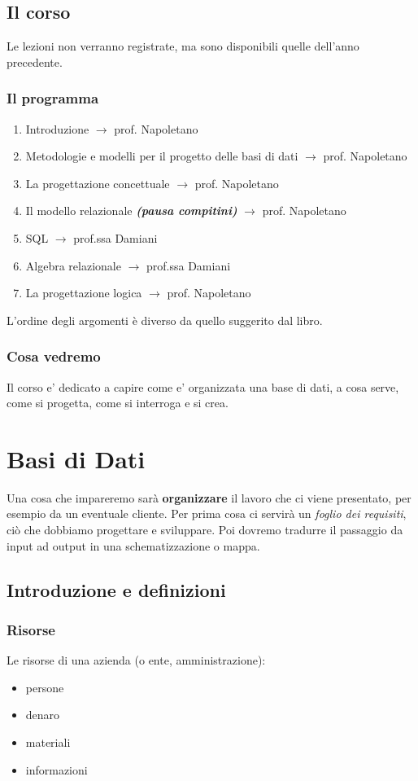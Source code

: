 \section{Il corso}
Le lezioni non verranno registrate, ma sono disponibili quelle dell'anno precedente.

\subsection{Il programma}
\begin{enumerate}
    \item Introduzione $\rightarrow$ prof. Napoletano
    \item Metodologie e modelli per il progetto delle basi di dati $\rightarrow$ prof. Napoletano
    \item La progettazione concettuale $\rightarrow$ prof. Napoletano
    \item Il modello relazionale \textbf{\textit{(pausa compitini)}} $\rightarrow$ prof. Napoletano
    \item SQL $\rightarrow$ prof.ssa Damiani
    \item Algebra relazionale $\rightarrow$ prof.ssa Damiani
    \item La progettazione logica $\rightarrow$ prof. Napoletano
\end{enumerate}
L'ordine degli argomenti è diverso da quello suggerito dal libro.

\subsection{Cosa vedremo}
Il corso e' dedicato a capire come e' organizzata una base di dati, a cosa serve, come si progetta, come si interroga e si crea.

\chapter{Basi di Dati}
Una cosa che impareremo sarà \textbf{organizzare} il lavoro che ci viene presentato, per esempio da un eventuale cliente. Per prima cosa ci servirà un \textit{foglio dei requisiti}, ciò che dobbiamo progettare e sviluppare. Poi dovremo tradurre il passaggio da input ad output in una schematizzazione o mappa.

\section{Introduzione e definizioni}
\subsection{Risorse}
Le risorse di una azienda (o ente, amministrazione):
\begin{itemize}
    \item persone
    \item denaro 
    \item materiali 
    \item informazioni
\end{itemize}

